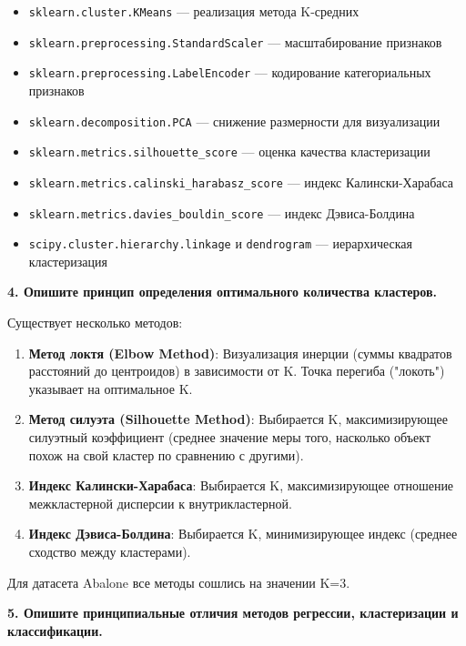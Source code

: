 \begin{itemize}
    \item \texttt{sklearn.cluster.KMeans} — реализация метода K-средних
    \item \texttt{sklearn.preprocessing.StandardScaler} — масштабирование признаков
    \item \texttt{sklearn.preprocessing.LabelEncoder} — кодирование категориальных признаков
    \item \texttt{sklearn.decomposition.PCA} — снижение размерности для визуализации
    \item \texttt{sklearn.metrics.silhouette\_score} — оценка качества кластеризации
    \item \texttt{sklearn.metrics.calinski\_harabasz\_score} — индекс Калински-Харабаса
    \item \texttt{sklearn.metrics.davies\_bouldin\_score} — индекс Дэвиса-Болдина
    \item \texttt{scipy.cluster.hierarchy.linkage} и \texttt{dendrogram} — иерархическая кластеризация
\end{itemize}

\textbf{4. Опишите принцип определения оптимального количества кластеров.}

Существует несколько методов:

\begin{enumerate}
    \item \textbf{Метод локтя (Elbow Method)}: Визуализация инерции (суммы квадратов расстояний до центроидов) в зависимости от K. Точка перегиба ("локоть") указывает на оптимальное K.
    
    \item \textbf{Метод силуэта (Silhouette Method)}: Выбирается K, максимизирующее силуэтный коэффициент (среднее значение меры того, насколько объект похож на свой кластер по сравнению с другими).
    
    \item \textbf{Индекс Калински-Харабаса}: Выбирается K, максимизирующее отношение межкластерной дисперсии к внутрикластерной.
    
    \item \textbf{Индекс Дэвиса-Болдина}: Выбирается K, минимизирующее индекс (среднее сходство между кластерами).
\end{enumerate}

Для датасета Abalone все методы сошлись на значении K=3.

\textbf{5. Опишите принципиальные отличия методов регрессии, кластеризации и классификации.}


